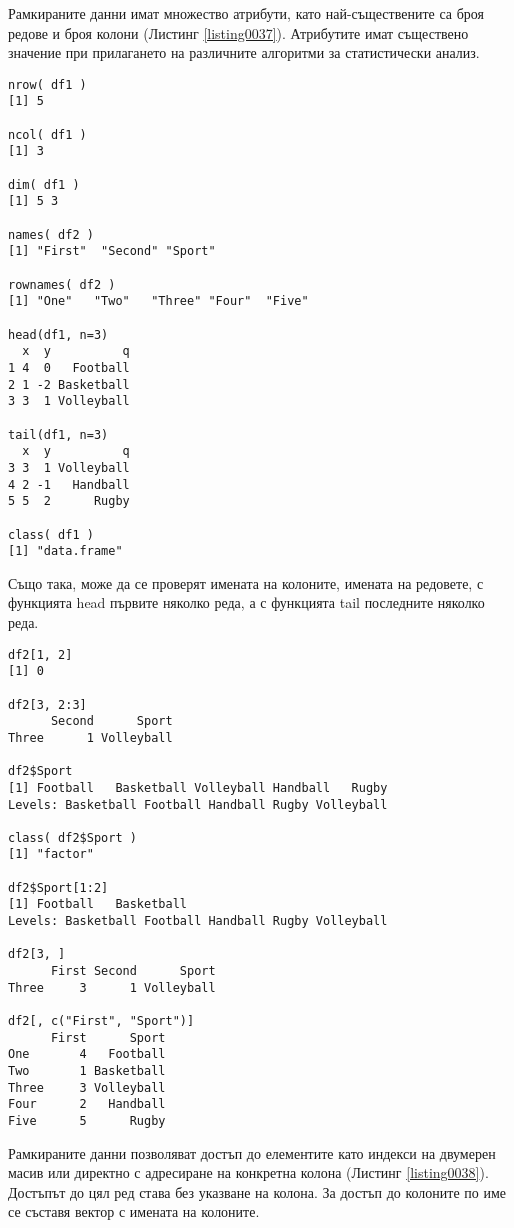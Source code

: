 Рамкираните данни имат множество атрибути, като най-съществените са броя редове и броя колони (Листинг \ref{listing0037}). Атрибутите имат съществено значение при прилагането на различните алгоритми за статистически анализ. 

\begin{lstlisting}[caption=Атрибути на рамкираните данни, label=listing0037]
nrow( df1 )
[1] 5

ncol( df1 )
[1] 3

dim( df1 )
[1] 5 3

names( df2 )
[1] "First"  "Second" "Sport"

rownames( df2 )
[1] "One"   "Two"   "Three" "Four"  "Five" 

head(df1, n=3)
  x  y          q
1 4  0   Football
2 1 -2 Basketball
3 3  1 Volleyball

tail(df1, n=3)
  x  y          q
3 3  1 Volleyball
4 2 -1   Handball
5 5  2      Rugby

class( df1 )
[1] "data.frame"
\end{lstlisting}

Също така, може да се проверят имената на колоните, имената на редовете, с функцията head първите няколко реда, а с функцията tail последните няколко реда.

\begin{lstlisting}[caption=Фактори в рамковите данни, label=listing0038]
df2[1, 2]
[1] 0

df2[3, 2:3]
      Second      Sport
Three      1 Volleyball

df2$Sport
[1] Football   Basketball Volleyball Handball   Rugby     
Levels: Basketball Football Handball Rugby Volleyball

class( df2$Sport )
[1] "factor"

df2$Sport[1:2]
[1] Football   Basketball
Levels: Basketball Football Handball Rugby Volleyball

df2[3, ]
      First Second      Sport
Three     3      1 Volleyball

df2[, c("First", "Sport")]
      First      Sport
One       4   Football
Two       1 Basketball
Three     3 Volleyball
Four      2   Handball
Five      5      Rugby
\end{lstlisting}

Рамкираните данни позволяват достъп до елементите като индекси на двумерен масив или директно с адресиране на конкретна колона (Листинг \ref{listing0038}). Достъпът до цял ред става без указване на колона. За достъп до колоните по име се съставя вектор с имената на колоните. 

